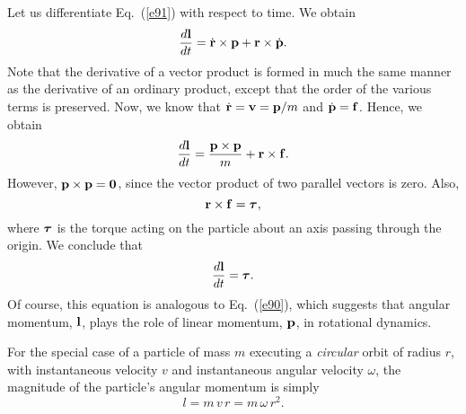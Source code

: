 Let us differentiate Eq.~(\ref{e91}) with respect to time. We obtain
\begin{equation}
\frac{d{\bf l}}{dt} = \dot{\bf r} \times {\bf p} + {\bf r} \times \dot{\bf p}.
\end{equation}
Note that the derivative of a vector product is formed in much the same manner as
the derivative of an ordinary product, except that the order of the various terms is
 preserved. Now, we know that $\dot{\bf r} = {\bf v} = {\bf p}/m$ and $\dot{\bf p} = {\bf f}$.
Hence, we obtain
\begin{equation}
\frac{d{\bf l}}{dt} = \frac{{\bf p} \times {\bf p}}{m} + {\bf r} \times {\bf f}.
\end{equation}
However, ${\bf p} \times {\bf p} = {\bf 0}$, since the vector product of two parallel
vectors is zero. Also,
\begin{equation}
{\bf r} \times {\bf f} = \mbox{\boldmath$\tau$},
\end{equation}
where $\mbox{\boldmath$\tau$}$ is the torque acting on the particle about an axis passing through the
origin. We conclude that
\begin{equation}
\frac{d{\bf l}}{dt} = \mbox{\boldmath$\tau$}.
\end{equation}
Of course, this equation is analogous to Eq.~(\ref{e90}), which suggests that angular
momentum, ${\bf l}$,  plays the role of linear momentum, ${\bf p}$, in rotational
dynamics.

For the special case of a particle of mass $m$ executing a {\em circular} orbit of radius $r$,
with instantaneous velocity $v$ and instantaneous angular velocity $\omega$, the
magnitude of the particle's angular momentum is simply
\begin{equation}
l = m\,v\,r = m\,\omega\,r^2.
\end{equation}

